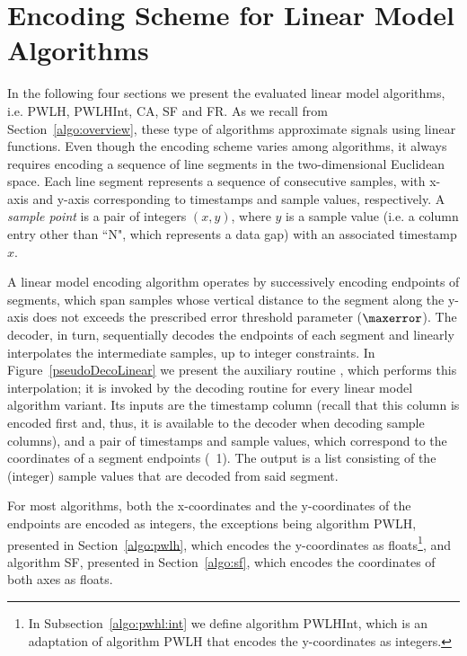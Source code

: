 
\section{Encoding Scheme for Linear Model Algorithms}
\label{algo:decolinear}


In the following four sections we present the evaluated linear model algorithms, i.e. PWLH, PWLHInt, CA, SF and FR. As we recall from Section~\ref{algo:overview}, these type of algorithms approximate signals using linear functions. Even though the encoding scheme varies among algorithms, it always requires encoding a sequence of line segments in the two-dimensional Euclidean space. Each line segment represents a sequence of consecutive samples, with x-axis and y-axis corresponding to timestamps and sample values, respectively. A \textit{sample point} is a pair of integers $(x,y)$, where $y$ is a sample value (i.e. a column entry other than ``N", which represents a data gap) with an associated timestamp $x$.


A linear model encoding algorithm operates by successively encoding endpoints of segments, which span samples whose vertical distance to the segment along the y-axis does not exceeds the prescribed error threshold parameter ($\maxerror$). The decoder, in turn, sequentially decodes the endpoints of each segment and linearly interpolates the intermediate samples, up to integer constraints. In Figure~\ref{pseudoDecoLinear} we present the auxiliary routine \decodeSegment, which performs this interpolation; it is invoked by the decoding routine for every linear model algorithm variant. Its inputs are the timestamp column (recall that this column is encoded first and, thus, it is available to the decoder when decoding sample columns), and a pair of timestamps and sample values, which correspond to the coordinates of a segment endpoints (\Line~1). The output is a list consisting of the (integer) sample values that are decoded from said segment.





\clearpage


\newcommand{\pwlhfoot}{\footnote{In Subsection~\ref{algo:pwhl:int} we define algorithm PWLHInt, which is an adaptation of algorithm PWLH that encodes the y-coordinates as integers.}}

For most algorithms, both the x-coordinates and the y-coordinates of the endpoints are encoded as integers, the exceptions being algorithm PWLH, presented in Section~\ref{algo:pwlh}, which encodes the y-coordinates as floats\pwlhfoot, and algorithm SF, presented in Section~\ref{algo:sf}, which encodes the coordinates of both axes as floats.


